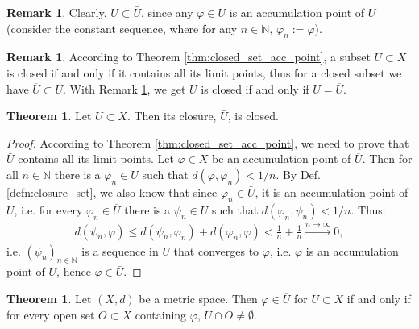 \documentclass[12pt, a4paper]{article}
\numberwithin{equation}{section}
\theoremstyle{definition}
\theoremstyle{definition}
\newtheorem{remark}[thm]{Remark} %
\newtheorem{theorem}[thm]{Theorem}
\begin{document}
	\begin{remark}\label{remark:closure_superset}
		Clearly, $U\subset \bar{U}$, since any $\varphi\in U$ is an accumulation point of $U$ (consider the constant sequence, where for any $n\in\mathbb N$, $\varphi_n := \varphi$).
	\end{remark}

	\begin{remark}
		According to Theorem \ref{thm:closed_set_acc_point}, a subset $U\subset X$ is closed if and only if it contains all its limit points, thus for a closed subset we have $\overline{U} \subset U$. With Remark \ref{remark:closure_superset}, we get $U$ is closed if and only if $U = \overline{U}$.
	\end{remark}
	
	\begin{theorem}\label{thrm:closure_closed}
		Let $U\subset X$. Then its closure, $\bar{U}$, is closed.
	\end{theorem}

	\begin{proof}
		According to Theorem \ref{thm:closed_set_acc_point}, we need to prove that $\bar{U}$ contains all its limit points. Let $\varphi\in X$ be an accumulation point of $\overline{U}$. Then for all $n\in \mathbb N$ there is a $\varphi_n\in\overline{U}$ such that $d(\varphi, \varphi_n) < 1/n$. By Def. \ref{defn:closure_set}, we also know that since $\varphi_n\in \bar{U}$, it is an accumulation point of $U$, i.e. for every $\varphi_n\in \overline{U}$ there is a $\psi_n\in U$ such that $d(\varphi_n, \psi_n) < 1/n$. Thus:
		\begin{align}
			d(\psi_n, \varphi) \leq d(\psi_n, \varphi_n) + d(\varphi_n, \varphi) < \frac{1}{n} + \frac{1}{n} \overset{n\to\infty}{\longrightarrow} 0,
		\end{align}
		i.e. $(\psi_n)_{n\in\mathbb N}$ is a sequence in $U$ that converges to $\varphi$, i.e. $\varphi$ is an accumulation point of $U$, hence $\varphi\in \bar{U}$.
	\end{proof}
	
	\begin{theorem}\label{thrm:property_metric_space}
		Let $(X, d)$ be a metric space. Then $\varphi\in \overline{U}$ for $U\subset X$ if and only if for every open set $O\subset X$ containing $\varphi$, $U\cap O\ne \emptyset$.
	\end{theorem}
\end{document}
